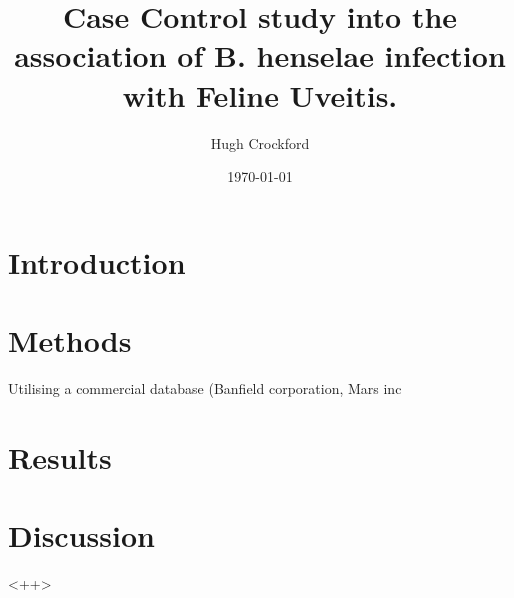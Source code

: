 \documentclass[12pt]{article}
\title{Case Control study into the association of B. henselae infection with Feline Uveitis.}
\author{Hugh Crockford}
\date{\today}
\begin{document}
\section{Introduction}

\section{Methods}
	Utilising a commercial database (Banfield corporation, Mars inc
\section{Results}
\section{Discussion}
<++>
\end{document}
